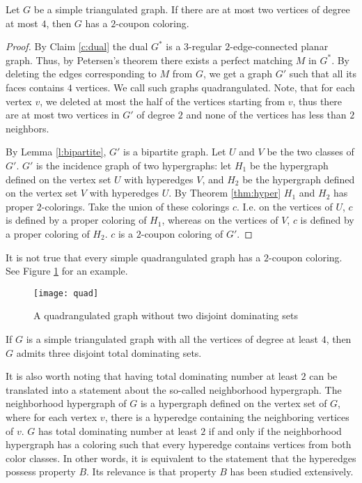 \begin{claim}
  Let $G$ be a simple triangulated graph. If there are at most two vertices of degree
  at most $4$, then $G$ has a $2$-coupon coloring.
\end{claim}
\begin{proof}
  By Claim \ref{c:dual} the dual $G^*$ is a $3$-regular $2$-edge-connected planar graph.
  Thus, by Petersen's theorem there exists a perfect matching $M$ in $G^*$. By deleting
  the edges corresponding to $M$ from $G$, we get a graph $G'$ such that all its faces contains
  $4$ vertices. We call such graphs quadrangulated. Note, that for each vertex $v$,
  we deleted at most the half of the vertices starting from $v$, thus there are at most
  two vertices in $G'$ of degree $2$ and none of the vertices has less than $2$ neighbors.

  By Lemma \ref{l:bipartite}, $G'$
  is a bipartite graph. Let $U$ and $V$ be the two classes of $G'$. $G'$ is the incidence
  graph of two hypergraphs: let $H_1$ be the hypergraph defined on the vertex set
  $U$ with hyperedges $V$, and $H_2$ be the hypergraph defined on the vertex set $V$
  with hyperedges $U$. By Theorem \ref{thm:hyper} $H_1$ and $H_2$ has proper $2$-colorings.
  Take the union of these colorings $c$. I.e. on the vertices of $U$, $c$ is defined
  by a proper coloring of $H_1$, whereas on the vertices of $V$, $c$ is defined
  by a proper coloring of $H_2$. $c$ is a $2$-coupon coloring of $G'$.
\end{proof}

\begin{remark}
  It is not true that every simple quadrangulated graph has a $2$-coupon coloring.
  See Figure \ref{fig:quad} for an example.
\end{remark}
\begin{figure}[h]
  \centering
  \texttt{[image: quad]}
  \caption{A quadrangulated graph without two disjoint dominating sets}
  \label{fig:quad}
\end{figure}

\begin{conj}
  If $G$ is a simple triangulated graph with all the vertices of degree at least
  $4$, then $G$ admits three disjoint total dominating sets.
\end{conj}


It is also worth noting that having total dominating number at least $2$ can be
translated into a statement about the so-called neighborhood hypergraph. The neighborhood
hypergraph of $G$ is a hypergraph defined on the vertex set of $G$, where for each vertex
$v$, there is a hyperedge containing the neighboring vertices of $v$. $G$ has total
dominating number at least $2$ if and only if the neighborhood hypergraph has a coloring
such that every hyperedge contains vertices from both color classes. In other words,
it is equivalent to the statement that the hyperedges possess property $B$. Its relevance
is that property $B$ has been studied extensively.
